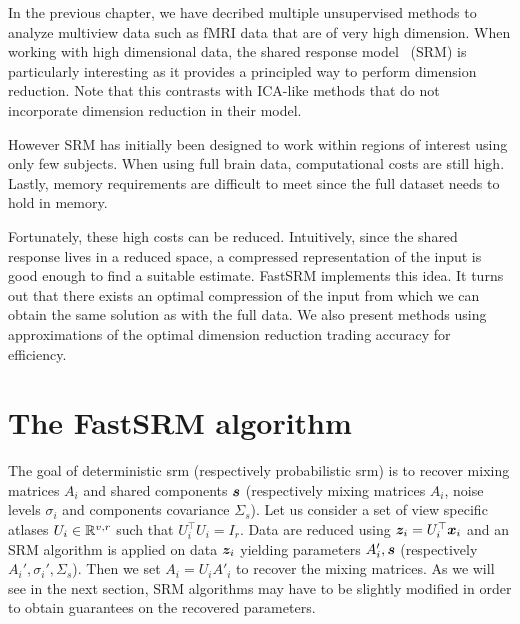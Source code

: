 In the previous chapter, we have decribed multiple unsupervised methods to analyze
multiview data such as fMRI data that are of very high dimension.
When working with high dimensional data, the shared response model~\cite{chen2015reduced} (SRM) is particularly
interesting as it provides a principled way to perform dimension reduction. Note that this
contrasts with ICA-like methods that do not incorporate dimension reduction in their model.

However SRM has initially been designed to work within regions of interest using
only few subjects. When using full brain data, computational costs are still
high. Lastly, memory requirements are difficult to meet since the full dataset needs to hold
in memory.

Fortunately, these high costs can be reduced. Intuitively, since the shared
response lives in a reduced space, a compressed representation of the input is
good enough to find a suitable estimate.
FastSRM implements this idea. It turns out that there exists an optimal
compression of the input from which we can obtain the same solution as
with the full data. We also present methods using approximations of the
optimal dimension reduction trading accuracy for efficiency.

\section{The FastSRM algorithm}
The goal of deterministic srm (respectively probabilistic srm) is to recover mixing matrices $A_i$ and shared
components $\boldsymbol{s}$ (respectively mixing matrices $A_i$, noise levels
$\sigma_i$ and components covariance $\Sigma_s$). 
Let us consider a set of view specific atlases $U_i \in \mathbb{R}^{v, r}$ such that
$U_i^{\top}U_i = I_r$.
Data are reduced using $\boldsymbol{z}_i = U_i^{\top} \boldsymbol{x}_i$ and an SRM algorithm is applied
on data $\boldsymbol{z}_i$ yielding parameters $A_i', \boldsymbol{s}$ (respectively $A_i',
\sigma_i', \Sigma_s$). Then we set $A_i = U_i A'_i$ to recover the mixing matrices.
As we will see in the next section, SRM algorithms may have to be slightly
modified in order to obtain guarantees on the recovered parameters.

